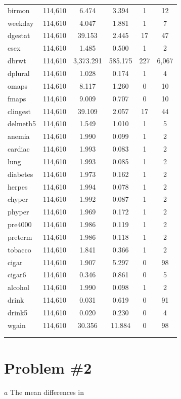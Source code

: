 \documentclass[a4paper, 12pt]{article}
\begin{document}
\begin{table}[!htbp]
\begin{tabular}{@{\extracolsep{5pt}}lccccc}
birmon & 114,610 & 6.474 & 3.394 & 1 & 12 \\ 
weekday & 114,610 & 4.047 & 1.881 & 1 & 7 \\ 
dgestat & 114,610 & 39.153 & 2.445 & 17 & 47 \\ 
csex & 114,610 & 1.485 & 0.500 & 1 & 2 \\ 
dbrwt & 114,610 & 3,373.291 & 585.175 & 227 & 6,067 \\ 
dplural & 114,610 & 1.028 & 0.174 & 1 & 4 \\ 
omaps & 114,610 & 8.117 & 1.260 & 0 & 10 \\ 
fmaps & 114,610 & 9.009 & 0.707 & 0 & 10 \\ 
clingest & 114,610 & 39.109 & 2.057 & 17 & 44 \\ 
delmeth5 & 114,610 & 1.549 & 1.010 & 1 & 5 \\ 
anemia & 114,610 & 1.990 & 0.099 & 1 & 2 \\ 
cardiac & 114,610 & 1.993 & 0.083 & 1 & 2 \\ 
lung & 114,610 & 1.993 & 0.085 & 1 & 2 \\ 
diabetes & 114,610 & 1.973 & 0.162 & 1 & 2 \\ 
herpes & 114,610 & 1.994 & 0.078 & 1 & 2 \\ 
chyper & 114,610 & 1.992 & 0.087 & 1 & 2 \\ 
phyper & 114,610 & 1.969 & 0.172 & 1 & 2 \\ 
pre4000 & 114,610 & 1.986 & 0.119 & 1 & 2 \\ 
preterm & 114,610 & 1.986 & 0.118 & 1 & 2 \\ 
tobacco & 114,610 & 1.841 & 0.366 & 1 & 2 \\ 
cigar & 114,610 & 1.907 & 5.297 & 0 & 98 \\ 
cigar6 & 114,610 & 0.346 & 0.861 & 0 & 5 \\ 
alcohol & 114,610 & 1.990 & 0.098 & 1 & 2 \\ 
drink & 114,610 & 0.031 & 0.619 & 0 & 91 \\ 
drink5 & 114,610 & 0.020 & 0.230 & 0 & 4 \\ 
wgain & 114,610 & 30.356 & 11.884 & 0 & 98 \\ 
\hline \\[-1.8ex] 
\normalsize 
\end{tabular} 
\end{table} 


\section{Problem \#2}
\(a\) The mean differences in 
\end{document}
